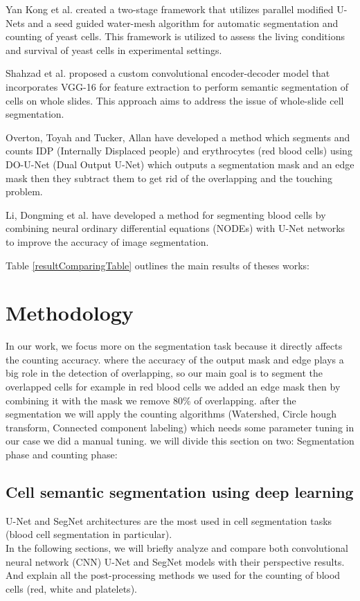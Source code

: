 \documentclass[conference]{IEEEtran}
\begin{document}
Yan Kong et al. \cite{Kong:20} created a two-stage framework that utilizes parallel modified U-Nets and a seed guided water-mesh algorithm for automatic segmentation and counting of yeast cells. This framework is utilized to assess the living conditions and survival of yeast cells in experimental settings.

Shahzad et al.  \cite{shahzad2020robust} proposed a custom convolutional encoder-decoder model that incorporates VGG-16 for feature extraction to perform semantic segmentation of cells on whole slides. This approach aims to address the issue of whole-slide cell segmentation. 

Overton, Toyah and Tucker, Allan \cite{10.1007/978-3-030-44584-3_31} have developed a method which segments and counts IDP (Internally Displaced people) and erythrocytes (red blood cells) using DO-U-Net (Dual Output U-Net) which outputs a segmentation mask and an edge mask then they subtract them to get rid of the overlapping and the touching problem.

Li, Dongming et al. \cite{li2021robust} have developed a method for segmenting blood cells by combining neural ordinary differential equations (NODEs) with U-Net networks to improve the accuracy of image segmentation.

Table \ref{resultComparingTable} outlines the main results of theses works:


\section{Methodology}
In our work, we focus more on the segmentation task because it directly affects the counting accuracy. where the accuracy of the output mask and edge plays a big role in the detection of overlapping, so our main goal is to segment the overlapped cells for example in red blood cells we added an edge mask then by combining it with the mask we remove 80\% of overlapping. after the segmentation we will apply the counting algorithms (Watershed, Circle hough transform, Connected component labeling) which needs some parameter tuning in our case we did a manual tuning. we will divide this section on two: Segmentation phase and counting phase:
\subsection{Cell semantic segmentation using deep learning}
U-Net and SegNet architectures are the most used in cell segmentation tasks \cite{asgari2021deep}
(blood cell segmentation in particular).\\
In the following sections, we will briefly analyze and compare both convolutional neural network (CNN) U-Net and SegNet models with their perspective results.
And explain all the post-processing methods we used for the counting of blood cells (red, white and platelets).
\end{document}
